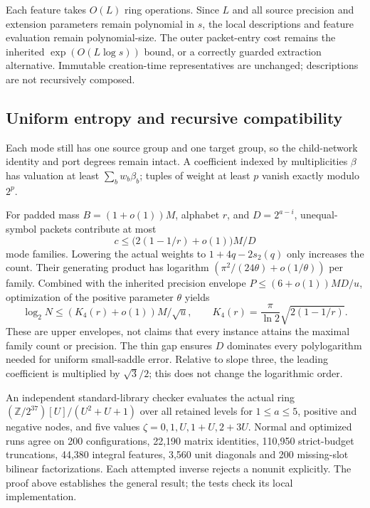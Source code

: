 Each feature takes $O(L)$ ring operations. Since $L$ and all source precision and extension parameters remain polynomial in $s$, the local descriptions and feature evaluation remain polynomial-size. The outer packet-entry cost remains the inherited $\exp(O(L\log s))$ bound, or a correctly guarded extraction alternative. Immutable creation-time representatives are unchanged; descriptions are not recursively composed.

\subsection{Uniform entropy and recursive compatibility}
Each mode still has one source group and one target group, so the child-network identity and port degrees remain intact. A coefficient indexed by multiplicities $\beta$ has valuation at least $\sum_b w_b\beta_b$; tuples of weight at least $p$ vanish exactly modulo $2^p$.

For padded mass $B=(1+o(1))M$, alphabet $r$, and $D=2^{a-i}$, unequal-symbol packets contribute at most
\[
 c\le\bigl(2(1-1/r)+o(1)\bigr)M/D
\]
mode families. Lowering the actual weights to $1+4q-2s_2(q)$ only increases the count. Their generating product has logarithm $(\pi^2/(24\theta)+o(1/\theta))$ per family. Combined with the inherited precision envelope $P\le(6+o(1))MD/u$, optimization of the positive parameter $\theta$ yields
\begin{equation}\label{eq:Kfour}
 \log_2N\le(K_4(r)+o(1))M/\sqrt u,\qquad
 K_4(r)=\frac\pi{\ln2}\sqrt{2(1-1/r)}.
\end{equation}
These are upper envelopes, not claims that every instance attains the maximal family count or precision. The thin gap ensures $D$ dominates every polylogarithm needed for uniform small-saddle error. Relative to slope three, the leading coefficient is multiplied by $\sqrt3/2$; this does not change the logarithmic order.

An independent standard-library checker evaluates the actual ring
$(\mathbb Z/2^{37})[U]/(U^2+U+1)$ over all retained levels for $1\le a\le5$, positive and negative nodes, and five values $\zeta=0,1,U,1+U,2+3U$. Normal and optimized runs agree on 200 configurations, 22,190 matrix identities, 110,950 strict-budget truncations, 44,380 integral features, 3,560 unit diagonals and 200 missing-slot bilinear factorizations. Each attempted inverse rejects a nonunit explicitly. The proof above establishes the general result; the tests check its local implementation.
